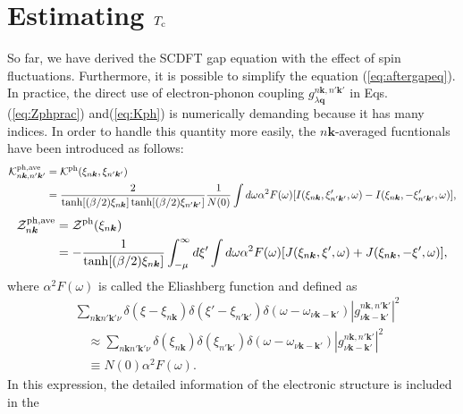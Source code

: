 \section{Estimating $T_{\rm c}$}
So far, we have derived the SCDFT gap equation with the effect of spin fluctuations.
Furthermore, it is possible to simplify the equation (\ref{eq:aftergapeq}).
In practice, the direct use of electron-phonon coupling $g^{n\bm k,n'\bm k'}_{\lambda\bm q}$ in
Eqs.(\ref{eq:Zphprac}) and(\ref{eq:Kph}) is numerically demanding because it has many indices.
In order to handle this quantity more easily, the $n\bm k$-averaged fucntionals have been
introduced\cite{Marques2005} as follows:
%
\begin{equation}
	\begin{split}
	\mathcal K^{\rm ph, ave}_{n\bm k, n'\bm k'} &= \mathcal K^{\rm ph}(\xi_{n\bm k},\xi_{n'\bm k'}) \\
	& = \frac{2}{\tanh[(\beta/2)\xi_{n\bm k}]\tanh[(\beta/2)\xi_{n'\bm k'}]}
	\frac{1}{N(0)} \int d\omega \alpha^2F(\omega)[I(\xi_{n\bm k},\xi'_{n' \bm k'},\omega) - I(\xi_{n\bm k},-\xi'_{n' \bm k'},\omega)],
	\label{eq:aveKph}
\end{split}
\end{equation}
%
\begin{equation}
	\begin{split}
	\mathcal Z^{\rm ph, ave}_{n \bm k} &= \mathcal Z^{\rm ph}(\xi_{n \bm k}) \\
	& = - \frac{1}{\tanh[(\beta/2)\xi_{n\bm k}]} \int_{-\mu}^{\infty} d\xi'
	\int d\omega \alpha^2F(\omega)[J(\xi_{n\bm k},\xi',\omega) + J(\xi_{n\bm k},-\xi', \omega)],
	\label{eq:aveZph}
\end{split}
\end{equation}
%
where $\alpha^2F(\omega)$ is called the Eliashberg function and defined as
%
\begin{equation}
	\begin{split}
	& \sum_{n\bm k n'\bm k' \nu} \delta(\xi-\xi_{n\bm k})\delta(\xi'-\xi_{n'\bm k'})
	\delta(\omega-\omega_{\nu\bm k - \bm k'})|g^{n\bm k,n'\bm k'}_{\nu \bm k - \bm k'}|^2 \\
	&\quad \approx \sum_{n\bm k n'\bm k' \nu} \delta(\xi_{n\bm k})\delta(\xi_{n'\bm k'})
	\delta(\omega-\omega_{\nu\bm k - \bm k'}) |g^{n\bm k,n'\bm k'}_{\nu \bm k - \bm k'}|^2 \\
 	&\quad \equiv N(0)\alpha^2F(\omega).
	\label{eq:a2F}
\end{split}
\end{equation}
%
In this expression, the detailed information of the electronic structure is included in the
